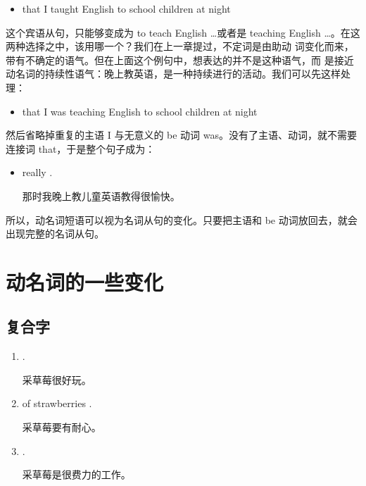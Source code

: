 \begin{itemize}
\item  that I taught English to school children at night
\end{itemize}

这个宾语从句，只能够变成为 to teach English \ldots 或者是 teaching
English \ldots。在这两种选择之中，该用哪一个？我们在上一章提过，不定词是由助动
词变化而来，带有不确定的语气。但在上面这个例句中，想表达的并不是这种语气，而
是接近动名词的持续性语气：晚上教英语，是一种持续进行的活动。我们可以先这样处
理：

\begin{itemize}
\item  that I was teaching English to school children at night
\end{itemize}

然后省略掉重复的主语 I 与无意义的 be 动词
was。没有了主语、动词，就不需要连接词 that，于是整个句子成为：

\begin{itemize}
\item {} really  .

那时我晚上教儿童英语教得很愉快。
\end{itemize}

所以，动名词短语可以视为名词从句的变化。只要把主语和 be
动词放回去，就会出现完整的名词从句。

\section{动名词的一些变化}

\subsection{复合字}

\begin{enumerate}
\item  {}  .

采草莓很好玩。
\item  {} of strawberries  .

采草莓要有耐心。
\item  {}  .

采草莓是很费力的工作。
\end{enumerate}

